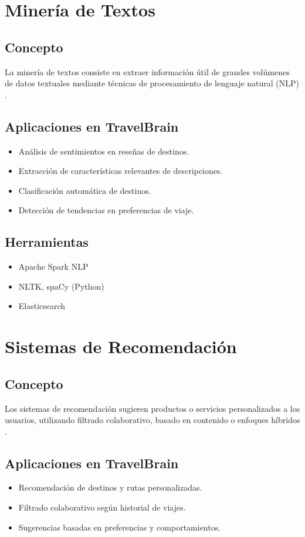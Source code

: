 \documentclass[12pt]{article}
\begin{document}
\section{Minería de Textos}
\subsection{Concepto}
La minería de textos consiste en extraer información útil de grandes volúmenes de datos textuales mediante técnicas de procesamiento de lenguaje natural (NLP) \citep{Aggarwal2012}.

\subsection{Aplicaciones en TravelBrain}
\begin{itemize}
    \item Análisis de sentimientos en reseñas de destinos.
    \item Extracción de características relevantes de descripciones.
    \item Clasificación automática de destinos.
    \item Detección de tendencias en preferencias de viaje.
\end{itemize}

\subsection{Herramientas}
\begin{itemize}
    \item Apache Spark NLP
    \item NLTK, spaCy (Python)
    \item Elasticsearch
\end{itemize}

\section{Sistemas de Recomendación}
\subsection{Concepto}
Los sistemas de recomendación sugieren productos o servicios personalizados a los usuarios, utilizando filtrado colaborativo, basado en contenido o enfoques híbridos \citep{Ricci2011}.

\subsection{Aplicaciones en TravelBrain}
\begin{itemize}
    \item Recomendación de destinos y rutas personalizadas.
    \item Filtrado colaborativo según historial de viajes.
    \item Sugerencias basadas en preferencias y comportamientos.
\end{itemize}
\end{document}
